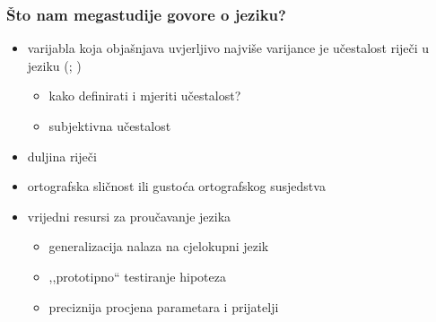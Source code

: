 \documentclass{beamer}
\newcommand{\tinycitep}[1]{%
    \bgroup
    \scriptsize
    \citep{#1}
    \egroup}
\begin{document}
\begin{frame}
    \frametitle{Što nam megastudije govore o jeziku?}

    \begin{itemize}
        \item varijabla koja objašnjava uvjerljivo najviše varijance je
            učestalost riječi u jeziku
            \bgroup
            \scriptsize
            (\citealp*{balotaVisualWordRecognition2006};
            \citealp[ch. 6]{harleyPsychologyLanguageData2014})
            \egroup
        \begin{itemize}
            \pause

            \item kako definirati i mjeriti učestalost?

            \pause

            \item subjektivna učestalost
        \end{itemize}

        \pause

        \item duljina riječi \tinycitep{ferrandMEGALEXMegastudyVisual2018,
            brysbaertImpactWordPrevalence2016}

        \pause

        \item ortografska sličnost ili gustoća ortografskog susjedstva
            \tinycitep{coltheartAccessInternalLexicon1977,
            yarkoniMovingColtheartNew2008}
    \end{itemize}
\end{frame}

\begin{frame}
    \begin{itemize}
        \item vrijedni resursi za proučavanje jezika

        \begin{itemize}
            \item generalizacija nalaza na cjelokupni jezik
                \tinycitep{yarkoniGeneralizabilityCrisis2019}

            \pause

            \item ,,prototipno`` testiranje hipoteza

            \pause

            \item preciznija procjena parametara i prijatelji
                \tinycitep{yarkoniChoosingPredictionExplanation2017}
        \end{itemize}

    \end{itemize}
\end{frame}
\end{document}
